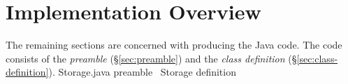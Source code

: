 \documentclass{article}
\def\nwendcode{\endtrivlist \endgroup}      %
\let\nwdocspar=\par
\theoremstyle{definition}                   %
\begin{document}
\section{Implementation Overview}
\label{sec:implementation-overview}
The remaining sections are concerned with producing the Java code.  The code
consists of the \emph{preamble} (\S\ref{sec:preamble}) and the \emph{class
definition} (\S\ref{sec:class-definition}).
\nwenddocs{}\endmoddef{}
\LA{}Storage.java preamble~{\nwtagstyle{}}\RA{}
\LA{}\code{}Storage\edoc{} definition~{\nwtagstyle{}}\RA{}
\nwendcode{}\nwdocspar
\end{document}
